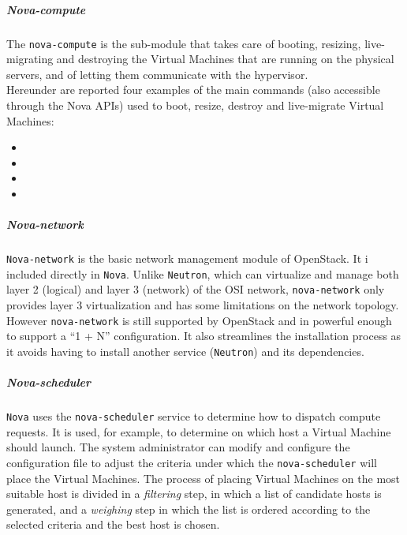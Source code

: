 \subparagraph{Nova-compute}
\label{par:openstack_nova_compute}
The \texttt{nova-compute} is the sub-module that takes care of booting, resizing, live-migrating and destroying the Virtual Machines that are running on the physical servers, and of letting them communicate with the hypervisor.\\
Hereunder are reported four examples of the main commands (also accessible through the Nova APIs) used to boot, resize, destroy and live-migrate Virtual Machines:
\begin{itemize}
	\item {}
	\item {}
	\item {}
	\item {}
\end{itemize}

\subparagraph{Nova-network}
\label{par:openstack_nova_net}
\texttt{Nova-network} is the basic network management module of OpenStack. It i included directly in \texttt{Nova}. Unlike \texttt{Neutron}, which can virtualize and manage both layer 2 (logical) and layer 3 (network) of the OSI network, \texttt{nova-network} only provides layer 3 virtualization and has some limitations on the network topology.\\
However \texttt{nova-network} is still supported by OpenStack and in powerful enough to support a ``1 + N'' configuration. It also streamlines the installation process as it avoids having to install another service (\texttt{Neutron}) and its dependencies.

\subparagraph{Nova-scheduler}
\label{par:openstack_nova_sched}
\texttt{Nova} uses the \texttt{nova-scheduler} service to determine how to dispatch compute requests. It is used, for example, to determine on which host a Virtual Machine should launch. The system administrator can modify and configure the  configuration file to adjust the criteria under which the \texttt{nova-scheduler} will place the Virtual Machines. The process of placing Virtual Machines on the most suitable host is divided in a \textit{filtering} step, in which a list of candidate hosts is generated, and a \textit{weighing} step in which the list is ordered according to the selected criteria and the best host is chosen.

